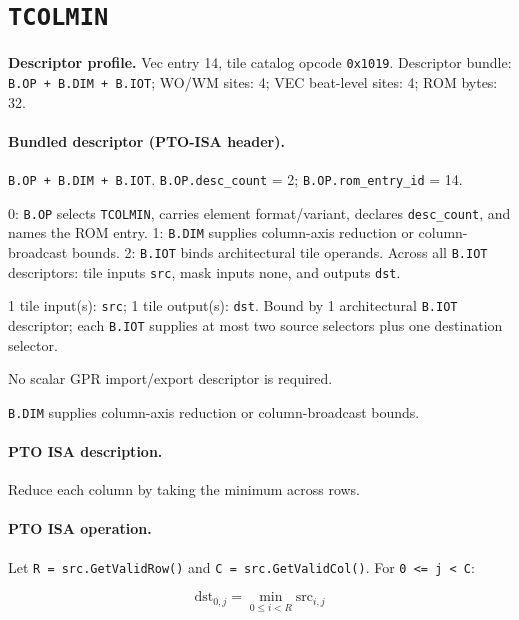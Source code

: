 \section{\texttt{TCOLMIN}}
\noindent\textbf{Descriptor profile.} Vec entry 14, tile catalog opcode \texttt{0x1019}. Descriptor bundle: \texttt{B.OP + B.DIM + B.IOT}; WO/WM sites: 4; VEC beat-level sites: 4; ROM bytes: 32.\par\smallskip
{}
\paragraph{Bundled descriptor (PTO-ISA header).}
\begin{description}[leftmargin=0.18\linewidth,style=nextline]
\item[Bundle] \texttt{B.OP + B.DIM + B.IOT}. \texttt{B.OP.desc\_count} = 2; \texttt{B.OP.rom\_entry\_id} = 14.
\item[Assembly] 0: \texttt{B.OP} selects \texttt{TCOLMIN}, carries element format/variant, declares \texttt{desc\_count}, and names the ROM entry. 1: \texttt{B.DIM} supplies column-axis reduction or column-broadcast bounds. 2: \texttt{B.IOT} binds architectural tile operands. Across all \texttt{B.IOT} descriptors: tile inputs \texttt{src}, mask inputs none, and outputs \texttt{dst}.
\item[Tile operands] 1 tile input(s): \texttt{src}; 1 tile output(s): \texttt{dst}. Bound by 1 architectural \texttt{B.IOT} descriptor; each \texttt{B.IOT} supplies at most two source selectors plus one destination selector.
\item[Scalar GPR operands] No scalar GPR import/export descriptor is required.
\item[Metadata operands] \texttt{B.DIM} supplies column-axis reduction or column-broadcast bounds.
\end{description}
\par\smallskip
{\small
\paragraph{PTO ISA description.}
Reduce each column by taking the minimum across rows.
\paragraph{PTO ISA operation.}
Let \texttt{R = src.GetValidRow()} and \texttt{C = src.GetValidCol()}. For \texttt{0 \textless{}= j \textless{} C}:

\[
\mathrm{dst}_{0,j} = \min_{0 \le i < R} \mathrm{src}_{i,j}
\]
}\par\smallskip
